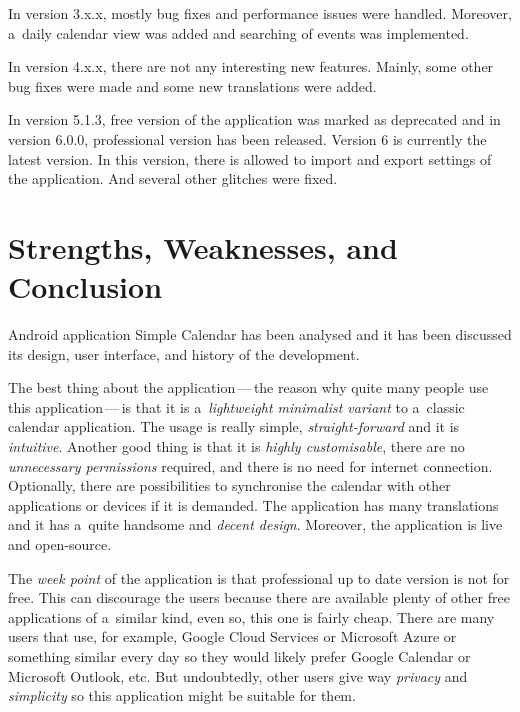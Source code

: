 \documentclass[a4paper, 11pt]{article}
\begin{document}
	In version 3.x.x, mostly bug fixes and performance issues
	were handled. Moreover, a~daily calendar view was added and
	searching of events was implemented.

	In version 4.x.x, there are not any interesting new features.
	Mainly, some other bug fixes were made and some new translations
	were added.

	In version 5.1.3, free version of the application was marked
	as deprecated and in version 6.0.0, professional version has been
	released. Version 6 is currently the latest version. In this version,
	there is allowed to import and export settings of the application.
	And several other glitches were fixed.


	\section{Strengths, Weaknesses, and Conclusion}
	\label{sec:conclusion}

	Android application Simple Calendar has been analysed and it has
	been discussed its design, user interface, and history of the
	development.

	The best thing about the application\,---\,the reason why quite many
	people use this application\,---\,is that it is a~\emph{lightweight
	minimalist variant} to a~classic calendar application. The usage is 
	really simple, \emph{straight-forward} and it is \emph{intuitive}. 
	Another good thing is that it is \emph{highly customisable}, there are 
	no \emph{unnecessary permissions} required, and there is no need for
	internet connection. Optionally, there are possibilities to synchronise
	the calendar with other applications or devices if it is demanded. The
	application has many translations and it has a~quite handsome and 
	\emph{decent design}. Moreover, the application is live and open-source.

	The \emph{week point} of the application is that professional up to date
	version is not for free. This can discourage the users because there
	are available plenty of other free applications of a~similar kind,
	even so, this one is fairly cheap. There are many users that use,
	for example, Google Cloud Services or Microsoft Azure or something
	similar every day so they would likely prefer Google Calendar or
	Microsoft Outlook, etc. But undoubtedly, other users give way
	\emph{privacy} and \emph{simplicity} so this application might be 
	suitable for them.
\end{document}
